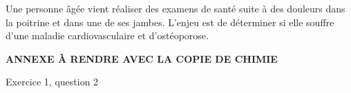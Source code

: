 \newpage
\vAligne{-80pt}

Une personne âgée vient réaliser des examens de santé suite à des douleurs dans la poitrine et dans une de ses jambes.
L'enjeu est de déterminer si elle souffre d'une maladie cardiovasculaire et d'ostéoporose.

\bigskip


\newpage


\vspace*{36pt}
\begin{boite}
  \centering
  \textbf{ANNEXE À RENDRE AVEC LA COPIE DE CHIMIE}
\end{boite}

Exercice 1, question 2

\begin{center}
\end{center}